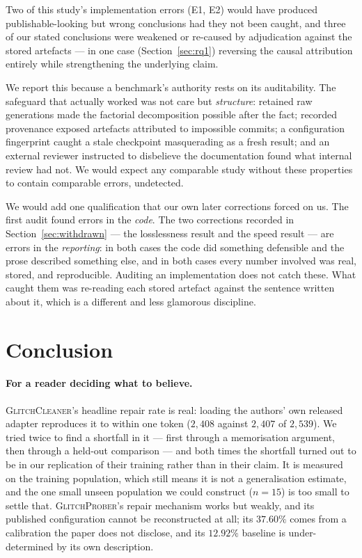 \documentclass[11pt,a4paper]{article}
\newcommand{\gp}{\textsc{GlitchProber}}
\newcommand{\gc}{\textsc{GlitchCleaner}}
\begin{document}
Two of this study's implementation errors (E1, E2) would have produced
publishable-looking but wrong conclusions had they not been caught, and three of
our stated conclusions were weakened or re-caused by adjudication against the
stored artefacts --- in one case (Section~\ref{sec:rq1}) reversing the causal
attribution entirely while strengthening the underlying claim.

We report this because a benchmark's authority rests on its auditability. The
safeguard that actually worked was not care but \emph{structure}: retained raw
generations made the factorial decomposition possible after the fact; recorded
provenance exposed artefacts attributed to impossible commits; a configuration
fingerprint caught a stale checkpoint masquerading as a fresh result; and an
external reviewer instructed to disbelieve the documentation found what internal
review had not. We would expect any comparable study without these properties to
contain comparable errors, undetected.

We would add one qualification that our own later corrections forced on us. The
first audit found errors in the \emph{code}. The two corrections recorded in
Section~\ref{sec:withdrawn} --- the losslessness result and the speed result ---
are errors in the \emph{reporting}: in both cases the code did something
defensible and the prose described something else, and in both cases every number
involved was real, stored, and reproducible. Auditing an implementation does not
catch these. What caught them was re-reading each stored artefact against the
sentence written about it, which is a different and less glamorous discipline.

\section{Conclusion}

\paragraph{For a reader deciding what to believe.} \gc{}'s headline repair rate is
real: loading the authors' own released adapter reproduces it to within one token
($2{,}408$ against $2{,}407$ of $2{,}539$). We tried twice to find a shortfall in
it --- first through a memorisation argument, then through a held-out comparison
--- and both times the shortfall turned out to be in our replication of their
training rather than in their claim. It is measured on the training population,
which still means it is not a generalisation estimate, and the one small unseen
population we could construct ($n = 15$) is too small to settle that. \gp{}'s
repair mechanism works but weakly, and its published configuration cannot be
reconstructed at all; its $37.60\%$ comes from a calibration the paper does not
disclose, and its $12.92\%$ baseline is under-determined by its own description.
\end{document}
